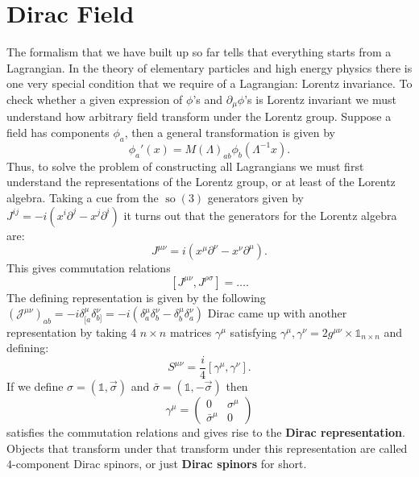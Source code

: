 \documentclass{report}
\theoremstyle{plain}
\theoremstyle{definition}
\theoremstyle{remark}
\newcommand{\FR}[2]{\frac{#1}{#2}}
\newcommand{\mc}{\mathcal}
\newcommand{\gam}{\gamma}
\newcommand{\sg}{\sigma}
\newcommand{\di}{\partial}
\newcommand{\iden}{\mathds{1}}
\DeclareMathOperator{\so}{so}
\begin{document}
\chapter{Dirac Field}
The formalism that we have built up so far tells that everything starts
from a Lagrangian. In the theory of elementary particles and high energy
physics there is one very special condition that we require of a
Lagrangian: Lorentz invariance. To check whether a given expression of
$\phi$'s and $\di_\mu\phi$'s is Lorentz invariant we must understand how
arbitrary field transform under the Lorentz group. Suppose a field has
components $\phi_a$, then a general transformation is given by
\[ \phi_a'(x) = M(\Lambda)_{ab}\phi_b(\Lambda^{-1}x). \]
Thus, to solve the problem of constructing all Lagrangians we must first
understand the representations of the Lorentz group, or at least of the
Lorentz algebra. Taking a cue from the $\so(3)$ generators given by
$J^{ij}=-i(x^i\di^j-x^j\di^i)$ it turns out that the generators for the
Lorentz algebra are:
\[ J^{\mu\nu} = i(x^\mu\di^\nu-x^\nu\di^\mu).\]
This gives commutation relations
\[ [J^{\mu\nu},J^{\rho\sg}] = \dots .\]
The defining representation is given by the following$(\mc
J^{\mu\nu})_{ab} = -i\delta^\mu_{[a}\delta^\nu_{b]}
=-i(\delta^\mu_{a}\delta^\nu_{b} -\delta^\mu_{b}\delta^\nu_{a})$
Dirac came up with another representation by taking 4 $n\times n$ matrices
$\gam^\mu$ satisfying ${\gam^\mu,\gam^\nu} = 2g^{\mu\nu}\times
\iden_{n\times n}$ and defining:
\[ S^{\mu\nu} = \FR{i}{4}[\gam^\mu,\gam^\nu].\]
If we define $\sg = (\iden,\vec\sigma)$ and $\bar\sg = (\iden,-\vec\sg)$
then \[\gam^\mu = \begin{pmatrix}0&\sg^\mu\\\bar\sg^\mu&0 \end{pmatrix}\] satisfies
the commutation relations and gives rise to the \textbf{Dirac
representation}. Objects that transform under that transform under this
representation are called $4$-component Dirac spinors, or just \textbf{Dirac
spinors} for short. 
\end{document}
